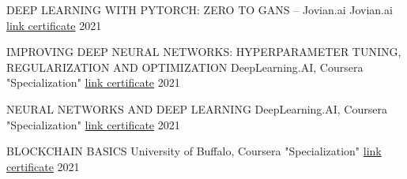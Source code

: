 

\begin{cvhonors}

  \cvhonor
    {DEEP LEARNING WITH PYTORCH: ZERO TO GANS – Jovian.ai} %
    {Jovian.ai \href{https://jovian.com/certificate/MFQTINJVGA}{link certificate}} %
    {} %
    {2021} %

  \cvhonor
    {IMPROVING DEEP NEURAL NETWORKS: HYPERPARAMETER TUNING, REGULARIZATION AND OPTIMIZATION} %
    {DeepLearning.AI, Coursera "Specialization" \href{https://www.coursera.org/account/accomplishments/verify/HRA43JLWKNAT}{link certificate}} %
    {} %
    {2021} %

  \cvhonor
    {NEURAL NETWORKS AND DEEP LEARNING} %
    {DeepLearning.AI, Coursera "Specialization" \href{https://www.coursera.org/account/accomplishments/verify/F9BLUEYK3HUN}{link certificate}} %
    {} %
    {2021} %

  \cvhonor
    {BLOCKCHAIN BASICS} %
    {University of Buffalo, Coursera "Specialization" \href{https://www.coursera.org/account/accomplishments/verify/GKL4ZULKLE4U}{link certificate}} %
    {} %
    {2021} %

\end{cvhonors}
